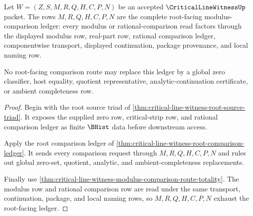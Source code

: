 \begin{theorem}
\label{thm:critical-line-witness-root-modulus-ledger-scope}
Let $W=(Z,S,M,R,Q,H,C,P,N)$ be an accepted $\CriticalLineWitnessUp$ packet. The rows $M,R,Q,H,C,P,N$ are the complete root-facing modulus-comparison ledger: every modulus or rational-comparison read factors through the displayed modulus row, real-part row, rational comparison ledger, componentwise transport, displayed continuation, package provenance, and local naming row.

No root-facing comparison route may replace this ledger by a global zero classifier, host equality, quotient representative, analytic-continuation certificate, or ambient completeness row.
\end{theorem}
\begin{proof}
Begin with the root source triad of \autoref{thm:critical-line-witness-root-source-triad}. It exposes the supplied zero row, critical-strip row, and rational comparison ledger as finite $\BHist$ data before downstream access.

Apply the root comparison ledger of \autoref{thm:critical-line-witness-root-comparison-ledger}. It sends every comparison request through $M,R,Q,H,C,P,N$ and rules out global zero-set, quotient, analytic, and ambient-completeness replacements.

Finally use \autoref{thm:critical-line-witness-modulus-comparison-route-totality}. The modulus row and rational comparison row are read under the same transport, continuation, package, and local naming rows, so $M,R,Q,H,C,P,N$ exhaust the root-facing ledger.
\end{proof}

